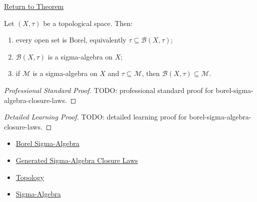 \newpage
{}
\label{prf:borel-sigma-algebra-closure-laws}

\begin{remark*}[Return]
\hyperref[thm:borel-sigma-algebra-closure-laws]{Return to Theorem}
\end{remark*}

\begin{theorem*}
Let \((X,\tau)\) be a topological space.  Then:
\begin{enumerate}[label=(\roman*)]
\item every open set is Borel, equivalently \(\tau\subseteq\mathcal B(X,\tau)\);
\item \(\mathcal B(X,\tau)\) is a sigma-algebra on \(X\);
\item if \(\mathcal M\) is a sigma-algebra on \(X\) and
      \(\tau\subseteq\mathcal M\), then
      \(\mathcal B(X,\tau)\subseteq\mathcal M\).
\end{enumerate}
\end{theorem*}

\begin{proof}[Professional Standard Proof]
\LRAProofBodyStart
TODO: professional standard proof for borel-sigma-algebra-closure-laws.
\end{proof}

\begin{proof}[Detailed Learning Proof]
\LRAProofBodyStart
TODO: detailed learning proof for borel-sigma-algebra-closure-laws.
\end{proof}

\begin{remark*}
\end{remark*}

\begin{dependencies}
\begin{itemize}
  \item \hyperref[def:borel-sigma-algebra]{Borel Sigma-Algebra}
  \item \hyperref[thm:generated-sigma-algebra-closure-laws]{Generated Sigma-Algebra Closure Laws}
  \item \hyperref[def:topology]{Topology}
  \item \hyperref[def:sigma-algebra]{Sigma-Algebra}
\end{itemize}
\end{dependencies}

\clearpage
